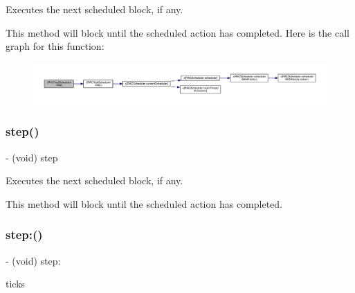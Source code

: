 Executes the next scheduled block, if any.

This method will block until the scheduled action has completed. Here is the call graph for this function\+:\nopagebreak
\begin{figure}[H]
\begin{center}
\leavevmode
\includegraphics[width=350pt]{interface_r_a_c_test_scheduler_a178d7eadc1d9f6a24e228dbc725d1ede_cgraph}
\end{center}
\end{figure}
\mbox{\label{interface_r_a_c_test_scheduler_a178d7eadc1d9f6a24e228dbc725d1ede}} 
\subsubsection{\texorpdfstring{step()}{step()}\hspace{0.1cm}{\footnotesize\ttfamily [3/3]}}
{\footnotesize\ttfamily -\/ (void) step \begin{DoxyParamCaption}{ }\end{DoxyParamCaption}}

Executes the next scheduled block, if any.

This method will block until the scheduled action has completed. \mbox{\label{interface_r_a_c_test_scheduler_a74b5961a618f9692baf91bbd52ab08e7}} 
\subsubsection{\texorpdfstring{step\+:()}{step:()}\hspace{0.1cm}{\footnotesize\ttfamily [1/3]}}
{\footnotesize\ttfamily -\/ (void) step\+: \begin{DoxyParamCaption}\item[{(N\+S\+U\+Integer)}]{ticks }\end{DoxyParamCaption}}

